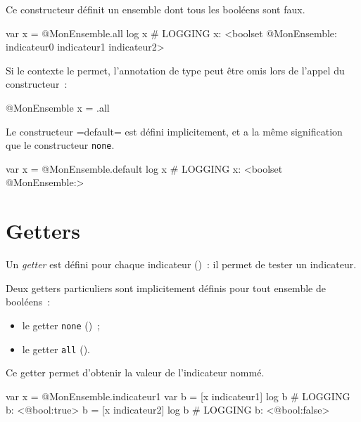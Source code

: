 Ce constructeur définit un ensemble dont tous les booléens sont faux.

\begin{galgas}
var x = @MonEnsemble.all
log x # LOGGING x: <boolset @MonEnsemble: indicateur0 indicateur1 indicateur2>
\end{galgas}

Si le contexte le permet, l'annotation de type peut être omis lors de l'appel du constructeur~:
\begin{galgas}
@MonEnsemble x = .all
\end{galgas}



Le constructeur \ggs=default= est défini implicitement, et a la même signification que le constructeur \texttt{none}.

\begin{galgas}
var x = @MonEnsemble.default
log x # LOGGING x: <boolset @MonEnsemble:>
\end{galgas}














\section{Getters}

Un \emph{getter} est défini pour chaque indicateur ()~: il permet de tester un indicateur.

Deux getters particuliers sont implicitement définis pour tout ensemble de booléens~:
\begin{itemize}
  \item le getter \texttt{none} ()~;
  \item le getter \texttt{all} ().
\end{itemize}


Ce getter permet d'obtenir la valeur de l'indicateur nommé.

\begin{galgas}
var x = @MonEnsemble.indicateur1
var b = [x indicateur1]
log b # LOGGING b: <@bool:true>
b = [x indicateur2]
log b # LOGGING b: <@bool:false>
\end{galgas}



